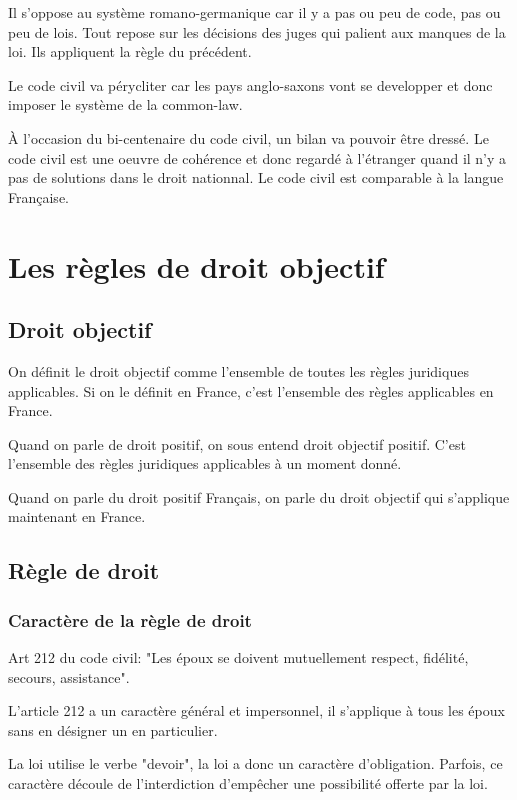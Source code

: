 \documentclass[12pt, a4paper, openany]{book}
\begin{document}
Il s'oppose au système romano-germanique car il y a pas ou peu de code, pas ou peu de lois. Tout repose sur les décisions des juges qui palient aux manques de la loi. Ils appliquent la règle du précédent. 

Le code civil va pérycliter car les pays anglo-saxons vont se developper et donc imposer le système de la common-law.

À l'occasion du bi-centenaire du code civil, un bilan va pouvoir être dressé. Le code civil est une oeuvre de cohérence et donc regardé à l'étranger quand il n'y a pas de solutions dans le droit nationnal. Le code civil est comparable à la langue Française. 

\chapter{Les règles de droit objectif}

\section{Droit objectif}

On définit le droit objectif comme l'ensemble de toutes les règles juridiques applicables. Si on le définit en France, c'est l'ensemble des règles applicables en France.

Quand on parle de droit positif, on sous entend droit objectif positif. C'est l'ensemble des règles juridiques applicables à un moment donné. 

Quand on parle du droit positif Français, on parle du droit objectif qui s'applique maintenant en France.

\section{Règle de droit}

\subsection{Caractère de la règle de droit}

Art 212 du code civil: "Les époux se doivent mutuellement respect, fidélité, secours, assistance". 

L'article 212 a un caractère général et impersonnel, il s'applique à tous les époux sans en désigner un en particulier. 

La loi utilise le verbe "devoir", la loi a donc un caractère d'obligation. Parfois, ce caractère découle de l'interdiction d'empêcher une possibilité offerte par la loi. 
\end{document}
